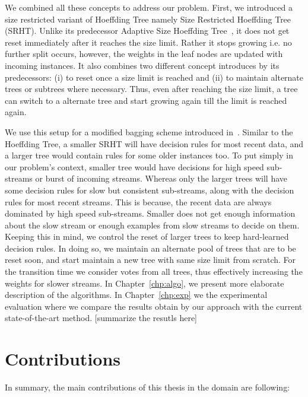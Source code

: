 We combined all these concepts to address our problem. First, we introduced a size restricted variant of Hoeffding Tree namely Size Restricted Hoeffding Tree (SRHT). Unlike its predecessor Adaptive Size Hoeffding Tree~\cite{bifet09:asht}, it does not get reset immediately after it reaches the size limit. Rather it stops growing i.e. no further split occurs, however, the weights in the leaf nodes are updated with incoming instances. It also combines two different concept introduces by its predecessors: (i) to reset once a size limit is reached and (ii) to maintain alternate trees or subtrees where necessary. Thus, even after reaching the size limit, a tree can switch to a alternate tree and start growing again till the limit is reached again. 

We use this setup for a modified bagging scheme introduced in~\cite{bifet09:asht}. Similar to the Hoeffding Tree, a smaller SRHT will have decision rules for most recent data, and a larger tree would contain rules for some older instances too. To put simply in our problem's context, smaller tree would have decisions for high speed sub-streams or burst of incoming streams. Whereas only the larger trees will have some decision rules for slow but consistent sub-streams, along with the decision rules for most recent streams. This is because, the recent data are always dominated by high speed sub-streams. Smaller does not get enough information about the slow stream or enough examples from slow streams to decide on them. Keeping this in mind, we control the reset of larger trees to keep hard-learned decision rules. In doing so, we maintain an alternate pool of trees that are to be reset soon, and start maintain a new tree with same size limit from scratch. For the transition time we consider votes from all trees, thus effectively increasing the weights for slower streams. In Chapter~\ref{chp:algo}, we present more elaborate description of the algorithms. In Chapter~\ref{chp:exp} we the  experimental evaluation where we compare the results obtain by our approach with the current state-of-the-art method. [summarize the resutls here]



\section{Contributions}
In summary, the main contributions of this thesis in the domain are following:

